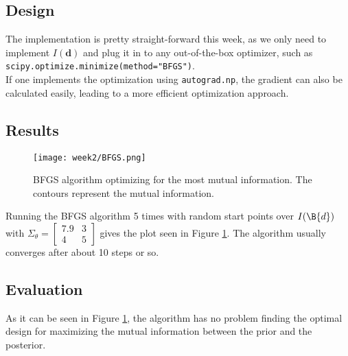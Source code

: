 \subsection{Design}
The implementation is pretty straight-forward this week, as we only need to implement $I(\textbf{d})$ and plug it in to any out-of-the-box optimizer, such as \texttt{scipy.optimize.minimize(method="BFGS")}.\\
If one implements the optimization using \texttt{autograd.np}, the gradient can also be calculated easily, leading to a more efficient optimization approach.
\subsection{Results}
\begin{figure}
  \centering
  \texttt{[image: week2/BFGS.png]}
  \caption{BFGS algorithm optimizing for the most mutual information. The contours represent the mutual information.}
  \label{fig:BFGS}
\end{figure}
Running the BFGS algorithm 5 times with random start points over $I(\B{d})$ with $\Sigma_\theta=\begin{bmatrix}7.9 & 3 \\ 4 & 5\end{bmatrix}$ gives the plot seen in Figure \ref{fig:BFGS}. The algorithm usually converges after about 10 steps or so.
\subsection{Evaluation}
As it can be seen in Figure \ref{fig:BFGS}, the algorithm has no problem finding the optimal design for maximizing the mutual information between the prior and the posterior.
